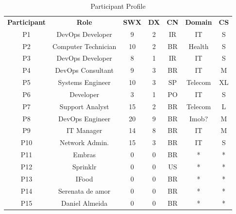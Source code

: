 \begin{table}[t]
\centering
\caption{Participant Profile}
\label{participant_table}
\begin{tabular}{ccccccc}
\textbf{Participant} & \textbf{Role}         & \textbf{SWX} & \textbf{DX} & \textbf{CN}   & \textbf{Domain}    & \multicolumn{1}{l}{\textbf{CS}} \\
P1                   & DevOps Developer      & 9            & 2           & IR            & IT                 & S                               \\
P2                   & Computer Technician   & 10           & 2           & BR            & Health             & S                               \\
P3                   & DevOps Developer      & 8            & 1           & IR            & IT                 & S                               \\
P4                   & DevOps Consultant     & 9            & 3           & BR            & IT                 & M                               \\
P5                   & Systems Engineer      & 10           & 3           & SP            & Telecom            & XL                              \\
P6                   & Developer             & 3            & 1           & PO            & IT                 & S                               \\
P7                   & Support Analyst       & 15           & 2           & BR            & Telecom            & L                               \\
P8                   & DevOps Engineer       & 20           & 9           & BR            & Imob?              & M                               \\
P9                   & IT Manager            & 14           & 8           & BR            & IT                 & M                               \\
P10                  & Network Admin.        & 15           & 3           & BR            & IT                 & S                               \\
P11                  & Embras                & 0            & 0           & BR            & *                  & *                               \\
P12                  & Sprinklr              & 0            & 0           & US            & *                  & *                               \\
P13                  & IFood                 & 0            & 0           & BR            & *                  & *                               \\
P14                  & Serenata de amor      & 0            & 0           & BR            & *                  & *                               \\
P15                  & Daniel Almeida        & 0            & 0           & BR            & *                  & *
\end{tabular}
\end{table}

